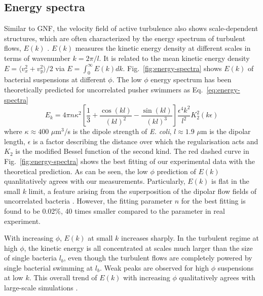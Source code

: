 \subsection{Energy spectra}

Similar to GNF, the velocity field of active turbulence also shows scale-dependent structures, which are often characterized by the energy spectrum of turbulent flows, $E(k)$ \cite{Liu2020}. $E(k)$ measures the kinetic energy density at different scales in terms of wavenumber $k = 2\pi/l$. It is related to the mean kinetic energy density $E = \langle v_x^2 + v_y^2 \rangle/2$ via $E = \int_0^\infty E(k)dk$. Fig.~\ref{fig:energy-spectra} shows $E(k)$ of bacterial suspensions at different $\phi$. The low $\phi$ energy spectrum has been theoretically predicted for uncorrelated pusher swimmers \cite{Bardfalvy2019} as Eq.~\ref{eq:energy-spectra}
\begin{equation}
\label{eq:energy-spectra}
E_k = 4\pi n \kappa^2 \left[ \frac{1}{3} + \frac{\cos(kl)}{(kl)^2} - \frac{\sin(kl)}{(kl)^3} \right] \frac{\epsilon^4k^2}{l^2} K_2^2(k\epsilon)
\end{equation}
where  $\kappa \approx 400$ $\mu$m$^3$/s is the dipole strength of \textit{E. coli}, $l\approx 1.9$ $\mu$m is the dipolar length, $\epsilon$ is a factor describing the distance over which the regularisation acts and $K_2$ is the modified Bessel function of the second kind. The red dashed curve in Fig.~\ref{fig:energy-spectra} shows the best fitting of our experimental data with the theoretical prediction. As can be seen, the low $\phi$ prediction of $E(k)$ quanlitatively agrees with our measurements.
Particularly, $E(k)$ is flat in the small $k$ limit, a feature arising from the superposition of the dipolar flow fields of uncorrelated bacteria \cite{Bardfalvy2019}. However, the fitting parameter $n$ for the best fitting is found to be 0.02\%, 40 times smaller compared to the parameter in real experiment. %

With increasing $\phi$, $E(k)$ at small $k$ increases sharply. In the turbulent regime at high $\phi$, the kinetic energy is all concentrated at scales much larger than the size of single bacteria $l_b$, even though the turbulent flows are completely powered by single bacterial swimming at $l_b$. %
Weak peaks are observed for high $\phi$ suspensions at low $k$. This overall trend of $E(k)$ with increasing $\phi$ qualitatively agrees with large-scale simulations \cite{Saintillan2012,Bardfalvy2019}.

